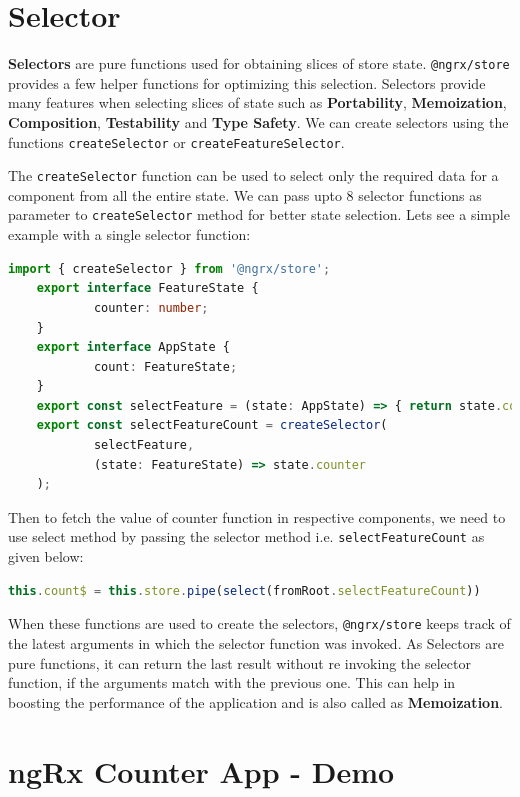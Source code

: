 \documentclass{report}
\begin{document}
\section{Selector}
\textbf{Selectors} are pure functions used for obtaining slices of store state. \lstinline{@ngrx/store} provides a few helper functions for optimizing this selection. Selectors provide many features when selecting slices of state such as \textbf{Portability}, \textbf{Memoization}, \textbf{Composition}, \textbf{Testability} and \textbf{Type Safety}.
We can create selectors using the functions \lstinline{createSelector} or \lstinline{createFeatureSelector}.

The \lstinline{createSelector} function can be used to select only the required data for a component from all the entire state. We can pass upto 8 selector functions as parameter to \lstinline{createSelector} method for better state selection.
Lets see a simple example with a single selector function:

\begin{lstlisting}[caption=create-selector-example.ts, language=Typescript]
	import { createSelector } from '@ngrx/store';
	export interface FeatureState {
			counter: number;
	}
	export interface AppState {
			count: FeatureState;
	}
	export const selectFeature = (state: AppState) => { return state.count };
	export const selectFeatureCount = createSelector(
			selectFeature,
			(state: FeatureState) => state.counter
	);
\end{lstlisting}

Then to fetch the value of counter function in respective components, we need to use select method by passing the selector method i.e. \lstinline{selectFeatureCount} as given below:
\begin{lstlisting}[caption=use the selector created, language=Typescript]
	this.count$ = this.store.pipe(select(fromRoot.selectFeatureCount))
\end{lstlisting}

When these functions are used to create the selectors, \lstinline{@ngrx/store} keeps track of the latest arguments in which the selector function was invoked. As Selectors are pure functions, it can return the last result without re invoking the selector function, if the arguments match with the previous one. This can help in boosting the performance of the application and is also called as \textbf{Memoization}.

\section{\textbf{ngRx Counter App - Demo}}
\end{document}
